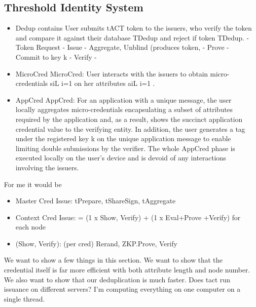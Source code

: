 \subsection{Threshold Identity System}
\begin{itemize}
    \item Dedup contains 
    User submits tACT token to the issuers, who verify the token and compare it against their database TDedup and reject if token  TDedup.
    - Token Request
    - Issue
    - Aggregate, Unblind (produces token, 
    - Prove
    - Commit to key k
    - Verify
    - 

    \item MicroCred
MicroCred: User interacts with the issuers to obtain micro-credentials {si}L  i=1 on her attributes {ai}L  i=1 .


    \item AppCred
    AppCred: For an application with a unique message, the user locally aggregates micro-credentials encapsulating a subset of attributes required by the application and, as a result, shows the succinct application credential value to the verifying entity. In addition, the user generates a tag under the registered key k on the unique application message to enable limiting double submissions by the verifier. The whole AppCred phase is executed locally on the user’s device and is devoid of any interactions involving the issuers.
    
\end{itemize}

For me it would be 
\begin{itemize}
    \item Master Cred Issue: tPrepare, tShareSign, tAggregate
    \item Context Cred Issue: = (1 x Show, Verify) + (1 x Eval+Prove +Verify) for each node
    \item (Show, Verify): (per cred) Rerand, ZKP.Prove, Verify
\end{itemize}























We want to show a few things in this section.
We want to show that the credential itself is far more efficient with both attribute length and node number.
We also want to show that our deduplication is much faster.
Does tact run issuance on different servers? I'm computing everything on one computer on a single thread.





